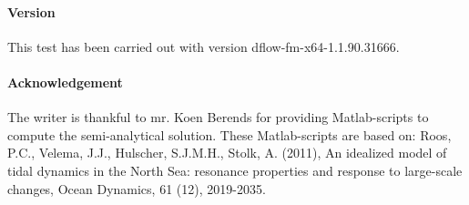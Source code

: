 \paragraph*{Version}
This test has been carried out with version dflow-fm-x64-1.1.90.31666.


\paragraph*{Acknowledgement}
The writer is thankful to mr. Koen Berends for providing Matlab-scripts to compute the semi-analytical solution. These Matlab-scripts are based on: Roos, P.C., Velema, J.J., Hulscher, S.J.M.H., Stolk, A. (2011), An idealized model of tidal dynamics in the North Sea: resonance properties and response to large-scale changes, Ocean Dynamics, 61 (12), 2019-2035.


